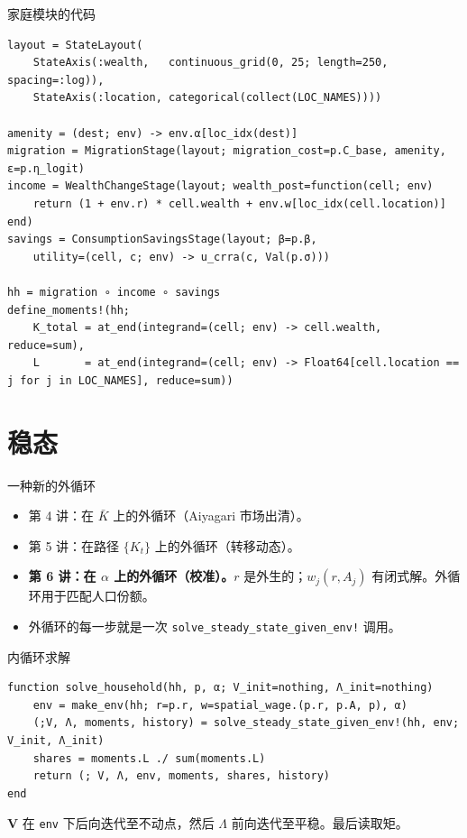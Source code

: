 \documentclass[10pt,aspectratio=169]{beamer}
\begin{document}
\begin{frame}[fragile]{家庭模块的代码}
\begin{lstlisting}
layout = StateLayout(
    StateAxis(:wealth,   continuous_grid(0, 25; length=250, spacing=:log)),
    StateAxis(:location, categorical(collect(LOC_NAMES))))

amenity = (dest; env) -> env.α[loc_idx(dest)]
migration = MigrationStage(layout; migration_cost=p.C_base, amenity, ε=p.η_logit)
income = WealthChangeStage(layout; wealth_post=function(cell; env)
    return (1 + env.r) * cell.wealth + env.w[loc_idx(cell.location)]
end)
savings = ConsumptionSavingsStage(layout; β=p.β,
    utility=(cell, c; env) -> u_crra(c, Val(p.σ)))

hh = migration ∘ income ∘ savings
define_moments!(hh;
    K_total = at_end(integrand=(cell; env) -> cell.wealth, reduce=sum),
    L       = at_end(integrand=(cell; env) -> Float64[cell.location == j for j in LOC_NAMES], reduce=sum))
\end{lstlisting}
\end{frame}

\section[稳态]{稳态}

\begin{frame}{一种新的外循环}

\begin{itemize}
  \item 第 4 讲：在 $\bar K$ 上的外循环（Aiyagari 市场出清）。
  \item 第 5 讲：在路径 $\{K_t\}$ 上的外循环（转移动态）。
  \item \textbf{第 6 讲：在 $\alpha$ 上的外循环（校准）。}$r$ 是外生的；$w_j(r, A_j)$ 有闭式解。外循环用于匹配人口份额。
  \item 外循环的每一步就是一次 \texttt{solve\_steady\_state\_given\_env!} 调用。
\end{itemize}

\end{frame}

\begin{frame}[fragile]{内循环求解}
\begin{lstlisting}
function solve_household(hh, p, α; V_init=nothing, Λ_init=nothing)
    env = make_env(hh; r=p.r, w=spatial_wage.(p.r, p.A, p), α)
    (;V, Λ, moments, history) = solve_steady_state_given_env!(hh, env; V_init, Λ_init)
    shares = moments.L ./ sum(moments.L)
    return (; V, Λ, env, moments, shares, history)
end
\end{lstlisting}

\textbf{V} 在 \texttt{env} 下后向迭代至不动点，然后 \textbf{$\Lambda$} 前向迭代至平稳。最后读取矩。

\end{frame}
\end{document}
